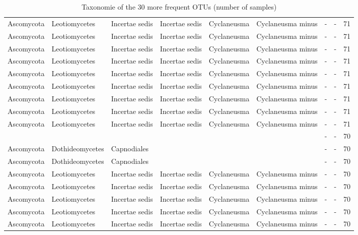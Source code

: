 \documentclass[12pt]{article}\usepackage[]{graphicx}\usepackage[]{color}
\numberwithin{figure}{section}
\begin{document}
\begin{landscape}
\begin{table}[ht]
\begin{tabular}{llllllllr}
  Ascomycota & Leotiomycetes & Incertae sedis & Incertae sedis & Cyclaneusma & Cyclaneusma minus & - & - & 71 \\ 
  Ascomycota & Leotiomycetes & Incertae sedis & Incertae sedis & Cyclaneusma & Cyclaneusma minus & - & - & 71 \\ 
  Ascomycota & Leotiomycetes & Incertae sedis & Incertae sedis & Cyclaneusma & Cyclaneusma minus & - & - & 71 \\ 
  Ascomycota & Leotiomycetes & Incertae sedis & Incertae sedis & Cyclaneusma & Cyclaneusma minus & - & - & 71 \\ 
  Ascomycota & Leotiomycetes & Incertae sedis & Incertae sedis & Cyclaneusma & Cyclaneusma minus & - & - & 71 \\ 
  Ascomycota & Leotiomycetes & Incertae sedis & Incertae sedis & Cyclaneusma & Cyclaneusma minus & - & - & 71 \\ 
  Ascomycota & Leotiomycetes & Incertae sedis & Incertae sedis & Cyclaneusma & Cyclaneusma minus & - & - & 71 \\ 
  Ascomycota & Leotiomycetes & Incertae sedis & Incertae sedis & Cyclaneusma & Cyclaneusma minus & - & - & 71 \\ 
  Ascomycota & Leotiomycetes & Incertae sedis & Incertae sedis & Cyclaneusma & Cyclaneusma minus & - & - & 71 \\ 
   &  &  &  &  &  & - & - & 70 \\ 
  Ascomycota & Dothideomycetes & Capnodiales &  &  &  & - & - & 70 \\ 
  Ascomycota & Dothideomycetes & Capnodiales &  &  &  & - & - & 70 \\ 
  Ascomycota & Leotiomycetes & Incertae sedis & Incertae sedis & Cyclaneusma & Cyclaneusma minus & - & - & 70 \\ 
  Ascomycota & Leotiomycetes & Incertae sedis & Incertae sedis & Cyclaneusma & Cyclaneusma minus & - & - & 70 \\ 
  Ascomycota & Leotiomycetes & Incertae sedis & Incertae sedis & Cyclaneusma & Cyclaneusma minus & - & - & 70 \\ 
  Ascomycota & Leotiomycetes & Incertae sedis & Incertae sedis & Cyclaneusma & Cyclaneusma minus & - & - & 70 \\ 
  Ascomycota & Leotiomycetes & Incertae sedis & Incertae sedis & Cyclaneusma & Cyclaneusma minus & - & - & 70 \\ 
   \hline
\end{tabular}
\endgroup
\caption{Taxonomie of the 30 more frequent OTUs (number of samples)} 
\end{table}

\end{landscape}
\end{document}
